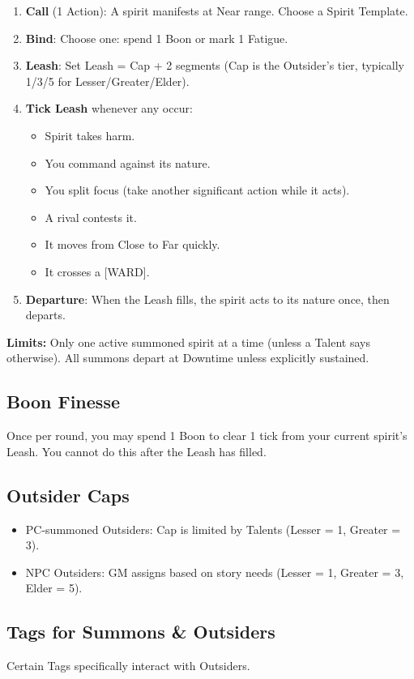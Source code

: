\begin{enumerate}
  \item \textbf{Call} (1 Action): A spirit manifests at Near range. Choose a Spirit Template.
  \item \textbf{Bind}: Choose one: spend 1 Boon or mark 1 Fatigue.
  \item \textbf{Leash}: Set Leash = Cap + 2 segments (Cap is the Outsider’s tier, typically 1/3/5 for Lesser/Greater/Elder).
  \item \textbf{Tick Leash} whenever any occur:
    \begin{itemize}
      \item Spirit takes harm.
      \item You command against its nature.
      \item You split focus (take another significant action while it acts).
      \item A rival contests it.
      \item It moves from Close to Far quickly.
      \item It crosses a [WARD].
    \end{itemize}
  \item \textbf{Departure}: When the Leash fills, the spirit acts to its nature once, then departs.
\end{enumerate}

\textbf{Limits:} Only one active summoned spirit at a time (unless a Talent says otherwise). All summons depart at Downtime unless explicitly sustained.

\subsection{Boon Finesse}
Once per round, you may spend 1 Boon to clear 1 tick from your current spirit’s Leash. You cannot do this after the Leash has filled.

\subsection{Outsider Caps}
\begin{itemize}
  \item PC-summoned Outsiders: Cap is limited by Talents (Lesser = 1, Greater = 3).
  \item NPC Outsiders: GM assigns based on story needs (Lesser = 1, Greater = 3, Elder = 5).
\end{itemize}

\subsection{Tags for Summons \& Outsiders}
Certain Tags specifically interact with Outsiders.


